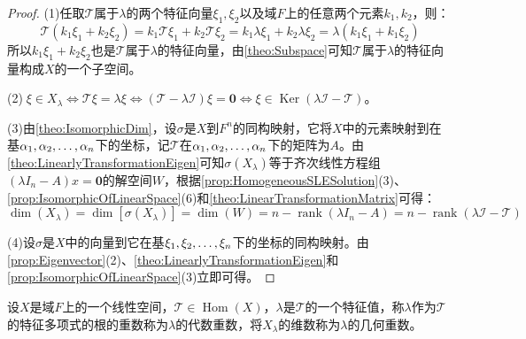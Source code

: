 \begin{proof}
	(1)任取$\mathcal{T}$属于$\lambda$的两个特征向量$\xi_1,\xi_2$以及域$F$上的任意两个元素$k_1,k_2$，则：
	\begin{equation*}
		\mathcal{T}(k_1\xi_1+k_2\xi_2)=k_1\mathcal{T}\xi_1+k_2\mathcal{T}\xi_2=k_1\lambda\xi_1+k_2\lambda\xi_2=\lambda(k_1\xi_1+k_1\xi_2)
	\end{equation*}
	所以$k_1\xi_1+k_2\xi_2$也是$\mathcal{T}$属于$\lambda$的特征向量，由\cref{theo:Subspace}可知$\mathcal{T}$属于$\lambda$的特征向量构成$X$的一个子空间。\par
	(2)$\;\xi\in X_{\lambda}\iff\mathcal{T}\xi=\lambda\xi\iff(\mathcal{T}-\lambda\mathcal{I})\xi=\mathbf{0}\iff\xi\in\operatorname{Ker}(\lambda\mathcal{I}-\mathcal{T})$。\par
	(3)由\cref{theo:IsomorphicDim}，设$\sigma$是$X$到$F^n$的同构映射，它将$X$中的元素映射到在基$\alpha_1, \alpha_2, \dots, \alpha_{n}$下的坐标，记$\mathcal{T}$在$\alpha_1, \alpha_2, \dots, \alpha_{n}$下的矩阵为$A$。由\cref{theo:LinearlyTransformationEigen}可知$\sigma(X_{\lambda})$等于齐次线性方程组$(\lambda I_n-A)x=\mathbf{0}$的解空间$W$，根据\cref{prop:HomogeneousSLESolution}(3)、\cref{prop:IsomorphicOfLinearSpace}(6)和\cref{theo:LinearTransformationMatrix}可得：
	\begin{equation*}
		\dim(X_{\lambda})=\dim[\sigma(X_\lambda)]=\dim(W)=n-\operatorname{rank}(\lambda I_n-A)=n-\operatorname{rank}(\lambda\mathcal{I}-\mathcal{T})
	\end{equation*}\par
	(4)设$\sigma$是$X$中的向量到它在基$\xi_1, \xi_2, \dots, \xi_{n}$下的坐标的同构映射。由\cref{prop:Eigenvector}(2)、\cref{theo:LinearlyTransformationEigen}和\cref{prop:IsomorphicOfLinearSpace}(3)立即可得。
\end{proof}
\begin{definition}
	设$X$是域$F$上的一个线性空间，$\mathcal{T}\in\operatorname{Hom}(X)$，$\lambda$是$\mathcal{T}$的一个特征值，称$\lambda$作为$\mathcal{T}$的特征多项式的根的重数称为$\lambda$的代数重数，将$X_{\lambda}$的维数称为$\lambda$的几何重数。
\end{definition}
